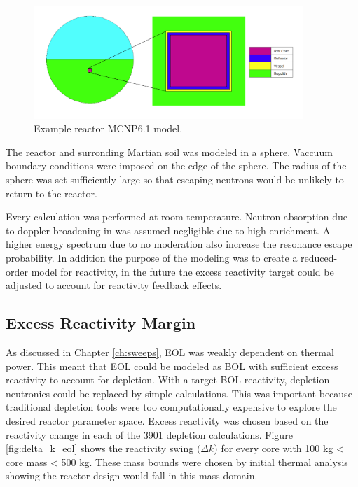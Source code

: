 \begin{figure}[h]
    \centering
    \includegraphics[width=4in]{../images/crit_model_geom.png}
\caption{Example reactor MCNP6.1 model.}
\label{fig:homog_model}
\end{figure}

The reactor and surronding Martian soil was modeled in a sphere. Vaccuum
boundary conditions were imposed on the edge of the sphere. The radius of the
sphere was set sufficiently large so that escaping neutrons would be unlikely to
return to the reactor.

Every \keff calculation was performed at room temperature. Neutron absorption
due to doppler broadening in \urantwo was assumed negligible due to high enrichment.
A higher energy spectrum due to no moderation also increase the resonance escape 
probability. In addition the purpose of the modeling was to create a
reduced-order model for reactivity, in the future the excess reactivity target
could be adjusted to account for reactivity feedback effects.

\subsection{Excess Reactivity Margin}
As discussed in Chapter \ref{ch:sweeps}, EOL \keff was weakly dependent on
thermal power. This meant that EOL \keff could be modeled as BOL \keff with
sufficient excess reactivity to account for depletion. With a target BOL reactivity,
depletion neutronics could be replaced by simple \keff calculations. This
was important because traditional depletion tools were too computationally
expensive to explore the desired reactor parameter space. Excess reactivity was
chosen based on the reactivity change in each of the 3901 depletion calculations. Figure
\ref{fig:delta_k_eol} shows the reactivity swing $(\Delta k$) for every core
with 100 kg < core mass < 500 kg. These mass bounds were chosen by initial thermal analysis
showing the reactor design would fall in this mass domain.

